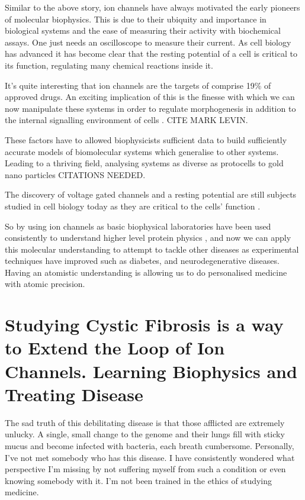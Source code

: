 Similar to the above story, ion channels have always motivated the early pioneers of molecular biophysics. This is due to their ubiquity and importance in biological systems and the ease of measuring their activity with biochemical assays. One just needs an oscilloscope to measure their current. As cell biology has advanced it has become clear that the resting potential of a cell is critical to its function, regulating many chemical reactions inside it.

It's quite interesting that ion channels are the targets of comprise 19\% of approved drugs.\cite{santos2017} An exciting implication of this is the finesse with which we can now manipulate these systems in order to regulate morphogenesis in addition to the internal signalling environment of cells \cite{}. CITE MARK LEVIN.

These factors have to allowed biophysicists sufficient data to build sufficiently accurate models of biomolecular systems which generalise to other systems. Leading to a thriving field, analysing systems as diverse as protocells to gold nano particles CITATIONS NEEDED.


The discovery of voltage gated channels and a resting potential are still subjects studied in cell biology today as they are critical to the cells' function \cite{}.

So by using ion channels as basic biophysical laboratories have been used consistently to understand higher level protein physics \cite{}, and now we can apply this molecular understanding to attempt to tackle other diseases as experimental techniques have improved such as diabetes, and neurodegenerative diseases. Having an atomistic understanding is allowing us to do personalised medicine with atomic precision.

\section{Studying Cystic Fibrosis is a way to Extend the Loop of Ion Channels. Learning Biophysics and Treating Disease}

The sad truth of this debilitating disease is that those afflicted are extremely unlucky. A single, small change to the genome and their lungs fill with sticky mucus and become infected with bacteria, each breath cumbersome. Personally, I've not met somebody who has this disease. I have consistently wondered what perspective I'm missing by not suffering myself from such a condition or even knowing somebody with it. I'm not been trained in the ethics of studying medicine.

